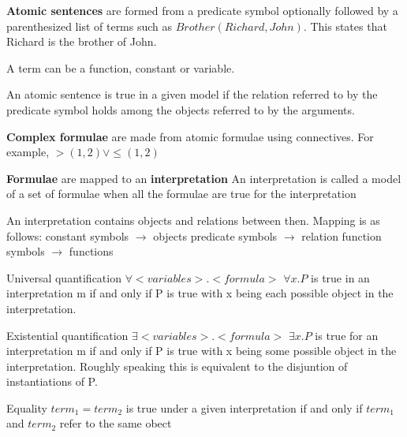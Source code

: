 \documentclass{article}
\begin{document}
\textbf{Atomic sentences} are formed from a predicate symbol optionally followed by a parenthesized list of terms such as $Brother(Richard,John)$. This states that Richard is the brother of John.

A term can be a function, constant or variable. \newline

An atomic sentence is true in a given model if the relation referred to by the predicate symbol holds among the objects referred to by the arguments. \newline 

\textbf{Complex formulae} are made from atomic formulae using connectives. For example, $>(1,2) \vee \leq(1,2)$ \newline

\textbf{Formulae} are mapped to an \textbf{interpretation} \newline 
An interpretation is called a model of a set of formulae when all the formulae are true for the interpretation \newline

An interpretation contains objects and relations between then. Mapping is as follows:
constant symbols $\rightarrow$ objects
predicate symbols $\rightarrow$ relation
function symbols $\rightarrow$ functions \newline 

Universal quantification
$\forall <variables>.<formula>$
$\forall x.P$ is true in an interpretation m if and only if P is true with x being each possible object in the interpretation. 

Existential quantification
$\exists <variables>.<formula>$
$\exists x. P$ is true for an interpretation m if and only if P is true with x being some possible object in the interpretation. Roughly speaking this is equivalent to the disjuntion of instantiations of P. 

Equality 
$term_1 = term_2$ is true under a given interpretation if and only if $term_1$ and $term_2$ refer to the same obect
\end{document}
